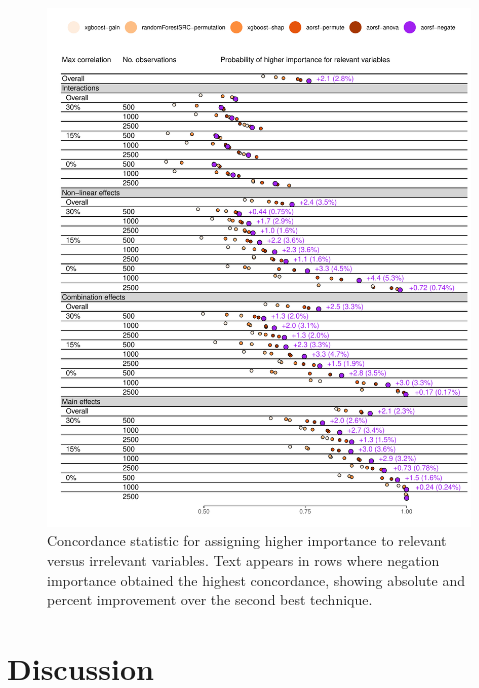 \documentclass{article}\usepackage[]{graphicx}\usepackage[]{xcolor}
\makeatletter
\def\maxwidth{ %
  \ifdim\Gin@nat@width>\linewidth
    \linewidth
  \else
    \Gin@nat@width
  \fi
}
\newenvironment{knitrout}{}{} %
\makeatother
\begin{document}
\begin{knitrout}
\color{fgcolor}\begin{figure}
\includegraphics[width=\maxwidth]{figure/bm_vi_viz-1} \caption[Concordance statistic for assigning higher importance to relevant versus irrelevant variables]{Concordance statistic for assigning higher importance to relevant versus irrelevant variables. Text appears in rows where negation importance obtained the highest concordance, showing absolute and percent improvement over the second best technique.}\label{fig:bm_vi_viz}
\end{figure}

\end{knitrout}


\section{Discussion} \label{sec:discussion}
\end{document}
